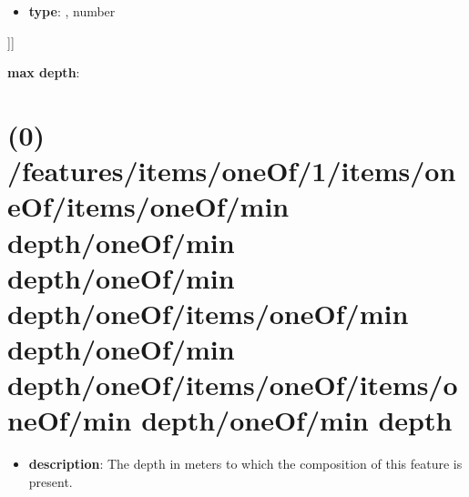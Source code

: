 \begin{itemize}[leftmargin=5em]\item {\bf type}: , number\end{itemize}]]\item {\bf max depth}: \section{(0) /features/items/oneOf/1/items/oneOf/items/oneOf/min depth/oneOf/min depth/oneOf/min depth/oneOf/items/oneOf/min depth/oneOf/min depth/oneOf/items/oneOf/items/oneOf/min depth/oneOf/min depth}
\begin{itemize}[leftmargin=0em]\item {\bf description}: The depth in meters to which the composition of this feature is present.
\end{itemize}
